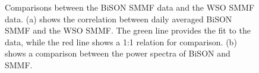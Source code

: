 \begin{figure}[ht!]
	\centering
	\qquad
	\caption{Comparisons between the BiSON SMMF data and the WSO SMMF data. (a) shows the correlation between daily averaged BiSON SMMF and the WSO SMMF. The green line provides the fit to the data, while the red line shows a 1:1 relation for comparison. (b) shows a comparison between the power spectra of BiSON and SMMF.} \label{fig:BiSON_vs_WSO}
\end{figure}






